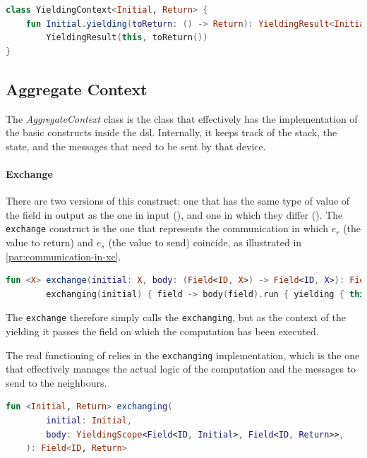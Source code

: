 \begin{lstlisting}[language=kt,label={lst:yieldingcontext}, caption={The signature of the \texttt{yielding context} class.}]
class YieldingContext<Initial, Return> {
    fun Initial.yielding(toReturn: () -> Return): YieldingResult<Initial, Return> =
        YieldingResult(this, toReturn())
}
\end{lstlisting}



\subsection{Aggregate Context}
\label{subsec:aggregate-context}

The \emph{AggregateContext} class is the class that effectively has the implementation of the basic constructs inside the \ac{dsl}.
Internally, it keeps track of the {stack}, the state, and the messages that need to be sent by that device.

\paragraph{Exchange}
There are two versions of this construct: one that has the same type of value of the field in output as the one in input (),
and one in which they differ ().
The \texttt{exchange} construct is the one that represents the communication in which $e_r$ (the value to return)
and $e_s$ (the value to send) coincide, as illustrated in \ref{par:communication-in-xc}.

\begin{lstlisting}[language=kt,label={lst:exchangeImpl},caption={The implementation of the \texttt{exchange} function.}]
fun <X> exchange(initial: X, body: (Field<ID, X>) -> Field<ID, X>): Field<ID, X> =
        exchanging(initial) { field -> body(field).run { yielding { this } } }
\end{lstlisting}

The \texttt{exchange} therefore simply calls the \texttt{exchanging}, but as the context of the yielding it passes the
field on which the computation has been executed.

The real functioning of \xc{} relies in the \texttt{exchanging} implementation, which is the one that effectively manages
the actual logic of the computation and the messages to send to the neighbours.

\begin{lstlisting}[language=kt,label={lst:exchanging},caption={The signature of the \texttt{exchanging} function.}]
fun <Initial, Return> exchanging(
        initial: Initial,
        body: YieldingScope<Field<ID, Initial>, Field<ID, Return>>,
    ): Field<ID, Return>
\end{lstlisting}

